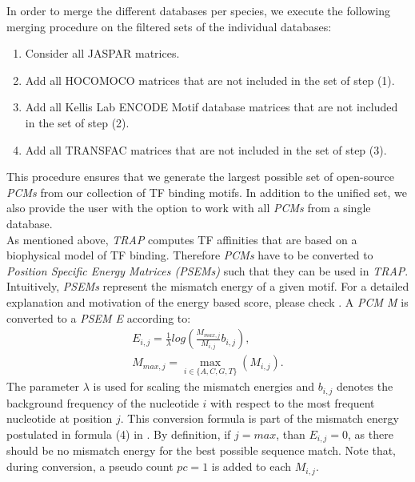 \documentclass{article}
\begin{document}
In order to merge the different databases per species, we execute the following merging procedure on the filtered sets of the individual databases:
\begin{enumerate}
\item Consider all JASPAR matrices.
\item Add all HOCOMOCO matrices that are not included in the set of step (1).
\item Add all Kellis Lab ENCODE Motif database matrices that are not included in the set of step (2).
\item Add all TRANSFAC matrices that are not included in the set of step (3).
\end{enumerate}
This procedure ensures that we generate the largest possible set of open-source \textit{PCMs} from our collection of TF binding motifs. In addition to the unified set,
we also provide the user with the option to work with all \textit{PCMs} from a single database. 
\bigskip
\\As mentioned above, \textit{TRAP} computes TF affinities that are based on a biophysical model of TF binding.
Therefore \textit{PCMs} have to be converted to \textit{Position Specific Energy Matrices (PSEMs)} such that they can be used in \textit{TRAP}.
Intuitively, \textit{PSEMs} represent the mismatch energy of a given motif. For a detailed explanation and motivation of the energy based score, please check \cite{pmid17098775}.
A \textit{PCM M} is converted to a \textit{PSEM E} according to:
\begin{align}
E_{i,j}=\frac{1}{\lambda}log(\frac{M_{max,j}}{M_{i,j}}b_{i,j}), \\
M_{max,j}=\max\limits_{i\in\{A,C,G,T\}}(M_{i,j}).
\end{align}
The parameter $\lambda$ is used for scaling the mismatch energies and $b_{i,j}$ denotes the background frequency of the nucleotide $i$ with respect to the most frequent nucleotide at position $j$. 
This conversion formula is part of the mismatch energy postulated in formula (4) in \cite{pmid17098775}. 
By definition, if $j=max$, than $E_{i,j}=0$, as there should be no mismatch energy for the best possible sequence match. 
Note that, during conversion, a pseudo count $pc = 1$ is added to each $M_{i,j}$. 
\end{document}
